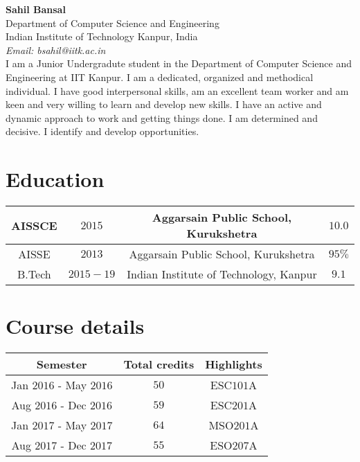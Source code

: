 \documentclass{article}
\begin{document}
\noindent\textbf{Sahil Bansal}\\
Department of Computer Science and Engineering\\
Indian Institute of Technology Kanpur, India\\
\textit{Email: bsahil@iitk.ac.in}\\
\hline
\hline
\vspace{0.1 cm}
\noindent I am a Junior Undergradute student in the Department of Computer Science and Engineering at IIT Kanpur. I am a dedicated, organized and methodical individual. I have good interpersonal skills, am an excellent team worker and am keen and very willing to learn and develop new skills. I have an active and dynamic approach to work and getting things done. I am determined and decisive. I identify and develop opportunities.
\vspace{0.1 cm}
\hline
\hline
\section*{\fontsize{10}{12}\selectfont Education}
\vspace*{-5mm}
\begin{table}[h!]
\begin{tabular}{|c|c|c|c|}
\hline
AISSCE & $2015$ & Aggarsain Public School, Kurukshetra & $10.0$ \\
\hline
AISSE & $2013$ & Aggarsain Public School, Kurukshetra & $95\%$ \\
\hline
B.Tech & $2015-19$ & Indian Institute of Technology, Kanpur & $9.1$ \\
\hline
\end{tabular}
\end{table}
\vspace*{-5mm}
\section*{\fontsize{10}{12}\selectfont Course details}
\vspace*{-5mm}
\begin{table}[h!]
\begin{tabular}{|c|c|c|}
\hline
{\bf Semester} & {\bf Total credits} & {\bf Highlights}\\
\hline
Jan $2016$ - May $2016$ & $50$ & ESC$101$A \\
\hline
Aug $2016$ - Dec $2016$ & $59$ & ESC$201$A \\
\hline
Jan $2017$ - May $2017$ & $64$ & MSO$201$A \\
\hline
Aug $2017$ - Dec $2017$ & $55$ & ESO$207$A \\
\hline
\end{tabular}
\end{table}
\vspace*{-5mm}
\end{document}
